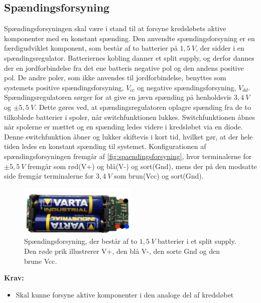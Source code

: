 \subsection{Spændingsforsyning}
Spændingsforsyningen skal være i stand til at forsyne kredsløbets aktive komponenter med en konstant spænding. Den anvendte spændingsforsyning er en færdigudviklet komponent, som består af to batterier på $1,5~V$, der sidder i en spændingsregulator. Batteriernes kobling danner et split supply, og derfor dannes der en jordforbindelse fra det ene batteris negative pol og den andens positive pol. De andre poler, som ikke anvendes til jordforbindelse, benyttes som systemets positive spændingsforsyning, ${V}_{cc}$ og negative spændingsforsyning, ${V}_{dd}$.
Spændingsregulatoren sørger for at give en jævn spænding på henholdsvis $3,4~V$ og $\pm 5,5~V$. Dette gøres ved, at spændingsregulatoren oplagre spænding fra de to tilkoblede batterier i spoler, når switchfunktionen lukkes. Switchfunktionen åbnes når spolerne er mættet og en spænding ledes videre i kredsløbet via en diode. Denne switchfunktion åbner og lukker skiftevis i kort tid, hvilket gør, at der hele tiden ledes en konstant spænding til systemet. 
Konfigurationen af spændingsforsyningen fremgår af \autoref{fig:spaendingsforsyning}, hvor terminalerne for $\pm 5,5~V$ fremgår som rød(V+) og blå(V-) og sort(Gnd), mens der på den modsatte side fremgår terminalerne for $3,4~V$ som brun(Vcc) og sort(Gnd). 

\begin{figure}[H]
\centering
\includegraphics[width=0.5\textwidth]{figures/spaendingsforsyning}
\caption{Spændingsforsyning, der består af to $1,5~V$ batterier i et split supply. Den røde prik illustrerer V+, den blå V-, den sorte Gnd og den brune Vcc.}
\label{fig:spaendingsforsyning}
\end{figure}

\textbf{Krav:}
\begin{itemize} 
\item Skal kunne forsyne aktive komponenter i den analoge del af kredsløbet
\end{itemize}
